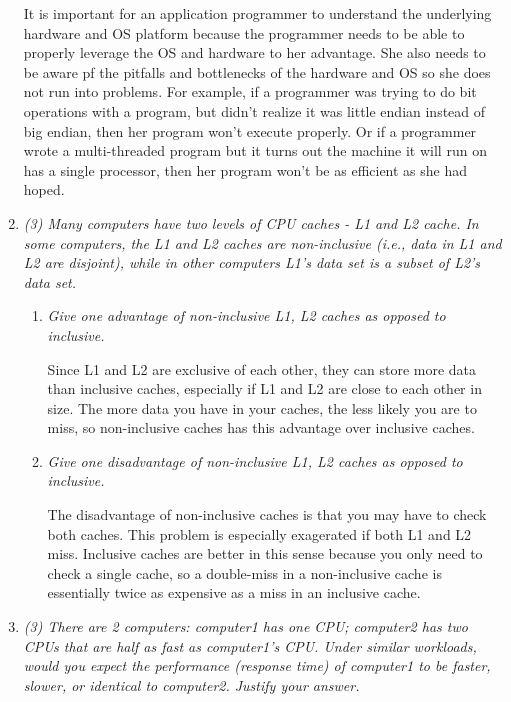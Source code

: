 \documentclass[letterpaper,11pt]{article}
\begin{document}
\begin{enumerate}
  It is important for an application programmer to understand the underlying hardware and OS platform because the programmer needs to be able to properly leverage the OS and hardware to her advantage.  She also needs to be aware pf the pitfalls and bottlenecks of the hardware and OS so she does not run into problems.  For example, if a programmer was trying to do bit operations with a program, but didn't realize it was little endian instead of big endian, then her program won't execute properly.  Or if a programmer wrote a multi-threaded program but it turns out the machine it will run on has a single processor, then her program won't be as efficient as she had hoped.
  \item \emph{(3) Many computers have two levels of CPU caches - L1 and L2 cache. In some computers, the L1 and L2 caches are non-inclusive (i.e., data in L1 and L2 are disjoint), while in other computers L1’s data set is a subset of L2’s data set.}

  \begin{enumerate}
    \item \emph{Give one advantage of non-inclusive L1, L2 caches as opposed to inclusive.}

    Since L1 and L2 are exclusive of each other, they can store more data than inclusive caches, especially if L1 and L2 are close to each other in size.  The more data you have in your caches, the less likely you are to miss, so non-inclusive caches has this advantage over inclusive caches.
    \item \emph{Give one disadvantage of non-inclusive L1, L2 caches as opposed to inclusive.}

    The disadvantage of non-inclusive caches is that you may have to check both caches.  This problem is especially exagerated if both L1 and L2 miss.  Inclusive caches are better in this sense because you only need to check a single cache, so a double-miss in a non-inclusive cache is essentially twice as expensive as a miss in an inclusive cache.
  \end{enumerate}
  \item \emph{(3) There are 2 computers: computer1 has one CPU; computer2 has two CPUs that are half as fast as computer1’s CPU. Under similar workloads, would you expect the performance (response time) of computer1 to be faster, slower, or identical to computer2. Justify your answer.}


\end{enumerate}
\end{document}
